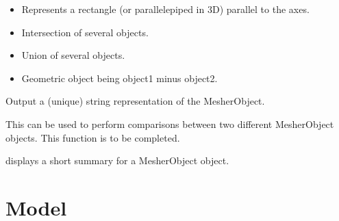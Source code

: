 \documentclass[a4paper,11pt,english]{sphinxmanual}
\begin{document}
\begin{fulllineitems}
\begin{itemize}
\item {} 
Represents a rectangle (or parallelepiped in 3D) parallel to the axes.

\item {} 
Intersection of several objects.

\item {} 
Union of several objects.

\item {} 
Geometric object being object1 minus object2.

\end{itemize}

\begin{fulllineitems}
\label{\detokenize{python/cmdref_MesherObject:getfem.MesherObject.char}}
Output a (unique) string representation of the MesherObject.

This can be used to perform comparisons between two
different MesherObject objects.
This function is to be completed.

\end{fulllineitems}


\begin{fulllineitems}
\label{\detokenize{python/cmdref_MesherObject:getfem.MesherObject.display}}
displays a short summary for a MesherObject object.

\end{fulllineitems}


\end{fulllineitems}



\section{Model}
\label{\detokenize{python/cmdref_Model:model}}\label{\detokenize{python/cmdref_Model::doc}}
\end{document}
